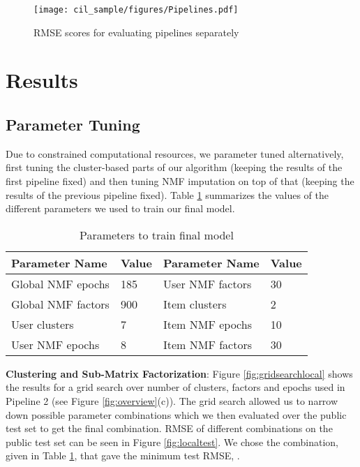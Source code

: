 \documentclass[10pt,conference,compsocconf]{IEEEtran}
\begin{document}
\begin{figure}[h]
  \centering
  \texttt{[image: cil\_sample/figures/Pipelines.pdf]}
  \caption{RMSE scores for evaluating pipelines separately}
  \label{fig:pipelines-separate}
\end{figure}


\section{Results}\label{sec:results}

\subsection{Parameter Tuning}
Due to constrained computational resources, we parameter tuned alternatively, first tuning the cluster-based parts of our algorithm (keeping the results of the first pipeline fixed) and then tuning NMF imputation on top of that (keeping the results of the previous pipeline fixed). Table \ref{table:params} summarizes the values of the different parameters we used to train our final model.

\begin{table}[H]
\centering
\begin{tabular}{|l|l||l|l|}
\hline
\textbf{Parameter Name} & \textbf{Value} & \textbf{Parameter Name} & \textbf{Value} \\ \hline
Global NMF epochs       & 185            & User NMF factors        & 30             \\ \hline
Global NMF factors      & 900            & Item clusters           & 2              \\ \hline
User clusters           & 7              & Item NMF epochs         & 10             \\ \hline
User NMF epochs         & 8              & Item NMF factors        & 30             \\ \hline
\end{tabular}\caption{Parameters to train final model} \label{table:params}
\end{table}



\textbf{Clustering and Sub-Matrix Factorization}: Figure \ref{fig:gridsearchlocal} shows the results for a grid search over number of clusters, factors and epochs used in Pipeline 2 (see Figure \ref{fig:overview}(c)). The grid search allowed us to narrow down possible parameter combinations which we then evaluated over the public test set to get the final combination. RMSE of different combinations on the public test set can be seen in Figure \ref{fig:localtest}. We chose the combination, given in Table \ref{table:params}, that gave the minimum test RMSE, .
\end{document}

